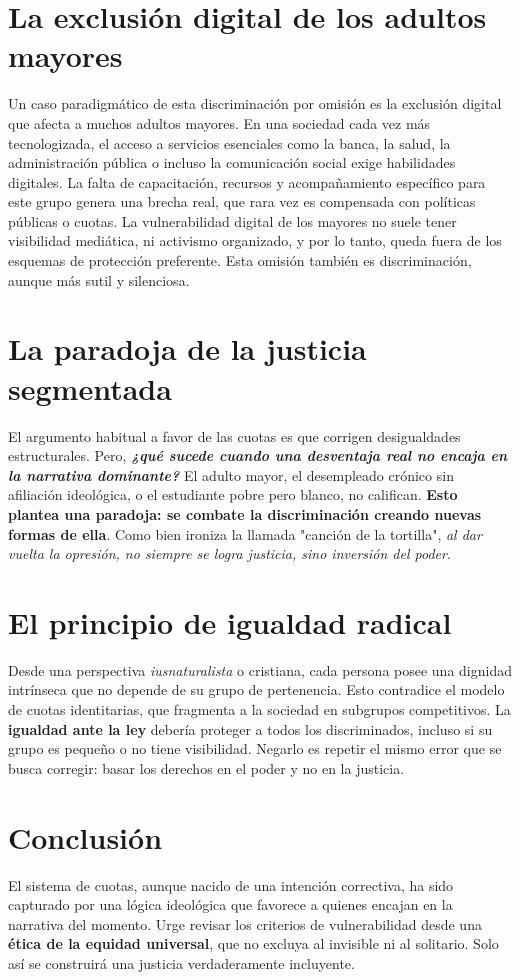 \documentclass[12pt]{article}
\begin{document}
\section*{La exclusión digital de los adultos mayores}
Un caso paradigmático de esta discriminación por omisión es la exclusión digital que afecta a muchos adultos mayores. En una sociedad cada vez más tecnologizada, el acceso a servicios esenciales como la banca, la salud, la administración pública o incluso la comunicación social exige habilidades digitales. La falta de capacitación, recursos y acompañamiento específico para este grupo genera una brecha real, que rara vez es compensada con políticas públicas o cuotas. La vulnerabilidad digital de los mayores no suele tener visibilidad mediática, ni activismo organizado, y por lo tanto, queda fuera de los esquemas de protección preferente. Esta omisión también es discriminación, aunque más sutil y silenciosa.

\section*{La paradoja de la justicia segmentada}
El argumento habitual a favor de las cuotas es que corrigen desigualdades estructurales. Pero, \textbf{\textit{¿qué sucede cuando una desventaja real no encaja en la narrativa dominante?}} El adulto mayor, el desempleado crónico sin afiliación ideológica, o el estudiante pobre pero blanco, no califican. \textbf{Esto plantea una paradoja: se combate la discriminación creando nuevas formas de ella}. Como bien ironiza la llamada "canción de la tortilla", \textit{al dar vuelta la opresión, no siempre se logra justicia, sino inversión del poder}.

\section*{El principio de igualdad radical}
Desde una perspectiva \textit{iusnaturalista} o cristiana, cada persona posee una dignidad intrínseca que no depende de su grupo de pertenencia. Esto contradice el modelo de cuotas identitarias, que fragmenta a la sociedad en subgrupos competitivos. La \textbf{igualdad ante la ley} debería proteger a todos los discriminados, incluso si su grupo es pequeño o no tiene visibilidad. Negarlo es repetir el mismo error que se busca corregir: basar los derechos en el poder y no en la justicia.

\section*{Conclusión}
El sistema de cuotas, aunque nacido de una intención correctiva, ha sido capturado por una lógica ideológica que favorece a quienes encajan en la narrativa del momento. Urge revisar los criterios de vulnerabilidad desde una \textbf{ética de la equidad universal}, que no excluya al invisible ni al solitario. Solo así se construirá una justicia verdaderamente incluyente.
\end{document}
